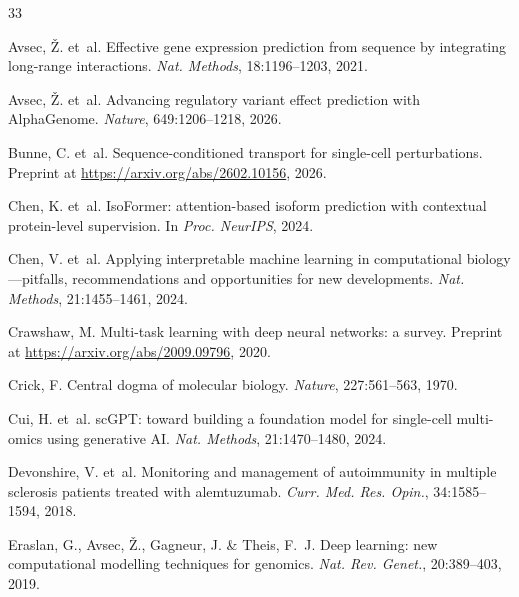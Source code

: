 \documentclass{article}
\begin{document}
\begin{thebibliography}{33}

Avsec, \v{Z}. et~al.
\newblock Effective gene expression prediction from sequence by integrating long-range interactions.
\newblock \emph{Nat. Methods}, 18:1196--1203, 2021.

Avsec, \v{Z}. et~al.
\newblock Advancing regulatory variant effect prediction with {AlphaGenome}.
\newblock \emph{Nature}, 649:1206--1218, 2026.

Bunne, C. et~al.
\newblock Sequence-conditioned transport for single-cell perturbations.
\newblock Preprint at \url{https://arxiv.org/abs/2602.10156}, 2026.

Chen, K. et~al.
\newblock IsoFormer: attention-based isoform prediction with contextual protein-level supervision.
\newblock In \emph{Proc. NeurIPS}, 2024.

Chen, V. et~al.
\newblock Applying interpretable machine learning in computational biology---pitfalls, recommendations and opportunities for new developments.
\newblock \emph{Nat. Methods}, 21:1455--1461, 2024.

Crawshaw, M.
\newblock Multi-task learning with deep neural networks: a survey.
\newblock Preprint at \url{https://arxiv.org/abs/2009.09796}, 2020.

Crick, F.
\newblock Central dogma of molecular biology.
\newblock \emph{Nature}, 227:561--563, 1970.

Cui, H. et~al.
\newblock sc{GPT}: toward building a foundation model for single-cell multi-omics using generative {AI}.
\newblock \emph{Nat. Methods}, 21:1470--1480, 2024.

Devonshire, V. et~al.
\newblock Monitoring and management of autoimmunity in multiple sclerosis patients treated with alemtuzumab.
\newblock \emph{Curr. Med. Res. Opin.}, 34:1585--1594, 2018.

Eraslan, G., Avsec, \v{Z}., Gagneur, J. \& Theis, F.~J.
\newblock Deep learning: new computational modelling techniques for genomics.
\newblock \emph{Nat. Rev. Genet.}, 20:389--403, 2019.


\end{thebibliography}
\end{document}
